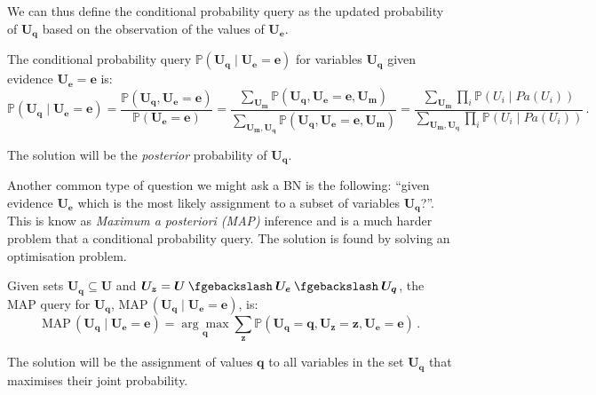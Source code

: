 We can thus define the conditional probability query as the updated probability of $\boldsymbol{U_q}$ based on the observation of the values of $\boldsymbol{U_e}$.
\begin{definition}
	The conditional probability query $\mathbb{P}(\boldsymbol{U_q} \mid \boldsymbol{U_e}=\boldsymbol{e})$ for variables $\boldsymbol{U_q}$ given evidence $\boldsymbol{U_e}=\boldsymbol{e}$ is:
\begin{equation*} 
	\mathbb{P}(\boldsymbol{U_q} \mid \boldsymbol{U_e}=\boldsymbol{e}) = \frac{\mathbb{P}(\boldsymbol{U_q},\boldsymbol{U_e}=\boldsymbol{e})}{\mathbb{P}(\boldsymbol{U_e}=\boldsymbol{e})} = \frac{ \sum\limits_{\boldsymbol{U_m}} \mathbb{P}(\boldsymbol{U_q},\boldsymbol{U_e}=\boldsymbol{e},\boldsymbol{U_m}) }{ \sum\limits_{\boldsymbol{U_m, U_q}} \mathbb{P}(\boldsymbol{U_q},\boldsymbol{U_e}=\boldsymbol{e},\boldsymbol{U_m}) } = 
	\frac{ \sum\limits_{\boldsymbol{U_m}} \prod_i \mathbb{P}(U_i \mid Pa(U_i)) }{ \sum\limits_{\boldsymbol{U_m, U_q}} \prod_i \mathbb{P}(U_i \mid Pa(U_i)) } \,.
\end{equation*}
\end{definition}
The solution will be the \textit{posterior} probability of $\boldsymbol{U_q}$.

Another common type of question we might ask a BN is the following: \enquote{given evidence $\boldsymbol{U_e}$ which is the most likely assignment to a subset of variables $\boldsymbol{U_q}$?}.
This is know as \textit{Maximum a posteriori (MAP)} inference and is a much harder problem that a conditional probability query.
The solution is found by solving an optimisation problem.
\begin{definition}  \label{def:map}
Given sets $\boldsymbol{U_q} \subseteq \boldsymbol{U}$ and $\boldsymbol{U_z} = \boldsymbol{U} \mysetminus \boldsymbol{U_e} \mysetminus \boldsymbol{U_q}$, the MAP query for $\boldsymbol{U_q}$, $\text{MAP}\,( \boldsymbol{U_q} \mid \boldsymbol{U_e}=\boldsymbol{e} )$, is:
	\begin{equation*}
		\text{MAP}\,( \boldsymbol{U_q} \mid \boldsymbol{U_e}=\boldsymbol{e} ) = \underset{\boldsymbol{q}}{\arg\max} \sum\limits_{\boldsymbol{z}} \mathbb{P}(\boldsymbol{U_q}=\boldsymbol{q}, \boldsymbol{U_z}=\boldsymbol{z} , \boldsymbol{U_e}=\boldsymbol{e}) \,.
	\end{equation*}
\end{definition}
The solution will be the assignment of values $\boldsymbol{q}$ to all variables in the set $\boldsymbol{U_q}$ that maximises their joint probability.

